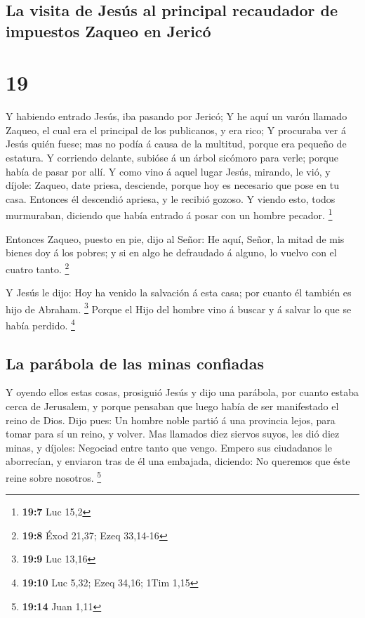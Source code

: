 \hypertarget{la-visita-de-jesuxfas-al-principal-recaudador-de-impuestos-zaqueo-en-jericuxf3}{%
\subsection{La visita de Jesús al principal recaudador de impuestos
Zaqueo en
Jericó}\label{la-visita-de-jesuxfas-al-principal-recaudador-de-impuestos-zaqueo-en-jericuxf3}}

\hypertarget{section-18}{%
\section{19}\label{section-18}}

 Y habiendo entrado Jesús, iba pasando por Jericó;
 Y he aquí un varón llamado Zaqueo, el cual era el principal
de los publicanos, y era rico;  Y procuraba ver á Jesús
quién fuese; mas no podía á causa de la multitud, porque era pequeño de
estatura.  Y corriendo delante, subióse á un árbol sicómoro
para verle; porque había de pasar por allí.  Y como vino á
aquel lugar Jesús, mirando, le vió, y díjole: Zaqueo, date priesa,
desciende, porque hoy es necesario que pose en tu casa. 
Entonces él descendió apriesa, y le recibió gozoso.  Y
viendo esto, todos murmuraban, diciendo que había entrado á posar con un
hombre pecador. \footnote{\textbf{19:7} Luc 15,2}

 Entonces Zaqueo, puesto en pie, dijo al Señor: He aquí,
Señor, la mitad de mis bienes doy á los pobres; y si en algo he
defraudado á alguno, lo vuelvo con el cuatro tanto. \footnote{\textbf{19:8}
  Éxod 21,37; Ezeq 33,14-16}

 Y Jesús le dijo: Hoy ha venido la salvación á esta casa;
por cuanto él también es hijo de Abraham. \footnote{\textbf{19:9} Luc
  13,16}  Porque el Hijo del hombre vino á buscar y á
salvar lo que se había perdido. \footnote{\textbf{19:10} Luc 5,32; Ezeq
  34,16; 1Tim 1,15}

\hypertarget{la-paruxe1bola-de-las-minas-confiadas}{%
\subsection{La parábola de las minas
confiadas}\label{la-paruxe1bola-de-las-minas-confiadas}}

 Y oyendo ellos estas cosas, prosiguió Jesús y dijo una
parábola, por cuanto estaba cerca de Jerusalem, y porque pensaban que
luego había de ser manifestado el reino de Dios.  Dijo
pues: Un hombre noble partió á una provincia lejos, para tomar para sí
un reino, y volver.  Mas llamados diez siervos suyos, les
dió diez minas, y díjoles: Negociad entre tanto que vengo. 
Empero sus ciudadanos le aborrecían, y enviaron tras de él una embajada,
diciendo: No queremos que éste reine sobre nosotros. \footnote{\textbf{19:14}
  Juan 1,11}

